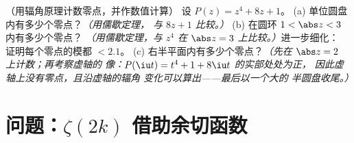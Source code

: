 \begin{exercise}[$\star\star$]\label{exo:b3:residues:12}
（用辐角原理计数零点，并作数值计算）
设 $P(z) = z^4 + 8z + 1$。
(a) 单位圆盘内有多少个零点？\emph{（用儒歇定理，
与 $8z + 1$ 比较。）}
(b) 在圆环 $1 < \abs z < 3$ 内有多少个零点？
\emph{（用儒歇定理，与 $z^4$ 在 $\abs z = 3$ 上比较。）}进一步细化：
证明每个零点的模都 $< 2.1$。
(c) 右半平面内有多少个零点？\emph{（先在
$\abs z = 2$ 上计数；再考察虚轴的
像：$P(\iu t) = t^4 + 1 + 8\iu t$ 的实部处处为正，
因此虚轴上没有零点，且沿虚轴的辐角
变化可以算出——最后以一个大的
半圆盘收尾。）}
\end{exercise}

\section{问题：\texorpdfstring{$\zeta(2k)$}{ζ(2k)}
借助余切函数}

